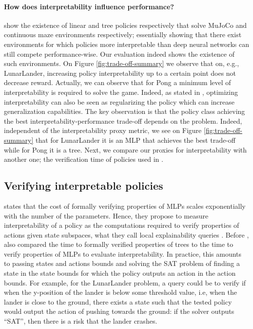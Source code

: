 \paragraph{How does interpretability influence performance?}
\cite{empirical-evidence,theory1} show the existence of linear and tree policies respectively that solve MuJoCo and continuous maze environments respectively; essentially showing that there exist environments for which policies more interpretable than deep neural networks can still compete performance-wise. Our evaluation indeed shows the existence of such environments. On Figure \ref{fig:trade-off-summary} we observe that on, e.g., 
LunarLander, increasing policy interpretability up to a certain point does not decrease reward. Actually, we can observe that for Pong a minimum level of interpretability is required to solve the game. Indeed, as stated in \cite{study-0}, optimizing interpretability can also be seen as regularizing the policy which can increase generalization capabilities. 
The key observation is that the policy class achieving the best interpretability-performance trade-off depends on the problem. Indeed, independent of the interpretability proxy metric, we see on Figure \ref{fig:trade-off-summary} that for LunarLander it is an MLP that achieves the best trade-off while for Pong it is a tree. Next, we compare our proxies for interpretability with another one; the verification time of policies used in \cite{viper,lens-complexity}.


\subsection{Verifying interpretable policies}
\cite{lens-complexity} states that the cost of formally verifying properties of MLPs scales exponentially with the number of the parameters. Hence, they propose to measure interpretability of a policy as the computations required to verify properties of actions given state subspaces, what they call local explainability queries \cite{query}. Before \cite{lens-complexity}, \cite{viper} also compared the time to formally verified properties of trees to the time to verify properties of MLPs to evaluate interpretability. In practice, this amounts to passing states and actions bounds and solving the SAT problem of finding a state in the state bounds for which the policy outputs an action in the action bounds. For example, for the LunarLander problem, a query could be to verify if when the y-position of the lander is below some threshold value, i.e, when the lander is close to the ground, there exists a state such that the tested policy would output the action of pushing towards the ground: if the solver outputs ``SAT'', then there is a risk that the lander crashes. 

